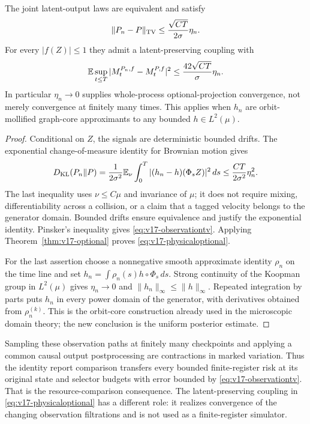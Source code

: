 \begin{theorem}
\label{thm:v17-physicaloptional}
The joint latent-output laws are equivalent and satisfy
\begin{equation}\label{eq:v17-observationtv}
 \|P_n-P\|_{\rm TV}\le\frac{\sqrt{CT}}{2\sigma}\eta_n.
\end{equation}
For every $|f(Z)|\le1$ they admit a latent-preserving coupling with
\begin{equation}\label{eq:v17-physicaloptional}
 \mathbb E\sup_{t\le T}|M^{P_n,f}_t-M^{P,f}_t|^2
                       \le\frac{42\sqrt{CT}}{\sigma}\eta_n.
\end{equation}
In particular $\eta_n\to0$ supplies whole-process optional-projection
convergence, not merely convergence at finitely many times. This
applies when $h_n$ are orbit-mollified graph-core approximants to any
bounded $h\in L^2(\mu)$.
\end{theorem}
\begin{proof}
Conditional on $Z$, the signals are deterministic bounded drifts.
The exponential change-of-measure identity for Brownian motion gives
\[
 D_{\rm KL}(P_n\|P)
 =\frac1{2\sigma^2}\mathbb E_\nu\int_0^T
                 |(h_n-h)(\Phi_s Z)|^2\,ds
 \le\frac{CT}{2\sigma^2}\eta_n^2.
\]
The last inequality uses $\nu\le C\mu$ and invariance of $\mu$;
it does not require mixing, differentiability across a collision,
or a claim that a tagged velocity belongs to the generator domain.
Bounded drifts ensure equivalence and justify the exponential
identity. Pinsker's inequality gives
\eqref{eq:v17-observationtv}. Applying
Theorem~\ref{thm:v17-optional} proves
\eqref{eq:v17-physicaloptional}.

For the last assertion choose a nonnegative smooth approximate
identity $\rho_n$ on the time line and set
$h_n=\int\rho_n(s)h\circ\Phi_s\,ds$.
Strong continuity of the Koopman group in $L^2(\mu)$ gives
$\eta_n\to0$ and $\|h_n\|_\infty\le\|h\|_\infty$.
Repeated integration by parts puts $h_n$ in every power domain of
the generator, with derivatives obtained from $\rho_n^{(k)}$.
This is the orbit-core construction already used in the microscopic
domain theory; the new conclusion is the uniform posterior estimate.
\end{proof}

Sampling these observation paths at finitely many checkpoints and
applying a common causal output postprocessing are contractions in
marked variation. Thus the identity report comparison transfers every
bounded finite-register risk at its original state and selector
budgets with error bounded by \eqref{eq:v17-observationtv}. That is the
resource-comparison consequence. The latent-preserving coupling in
\eqref{eq:v17-physicaloptional} has a different role: it realizes
convergence of the changing observation filtrations and is not used
as a finite-register simulator.

